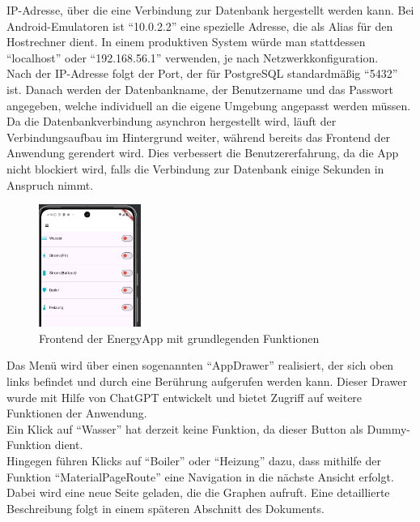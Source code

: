 \documentclass[11pt]{scrartcl}
\begin{document}
    IP-Adresse, über die eine Verbindung zur Datenbank hergestellt werden kann.
    Bei Android-Emulatoren ist \enquote{10.0.2.2} eine spezielle Adresse, die als Alias für den Hostrechner dient.
    In einem produktiven System würde man stattdessen \enquote{localhost} oder \enquote{192.168.56.1} verwenden,
    je nach Netzwerkkonfiguration. \\
    Nach der IP-Adresse folgt der Port, der für PostgreSQL standardmäßig \enquote{5432} ist.
    Danach werden der Datenbankname, der Benutzername und das Passwort angegeben, welche individuell an die eigene
    Umgebung angepasst werden müssen. \\
    Da die Datenbankverbindung asynchron hergestellt wird, läuft der Verbindungsaufbau im Hintergrund weiter, während
    bereits das Frontend der Anwendung gerendert wird.
    Dies verbessert die Benutzererfahrung, da die App nicht blockiert wird, falls die Verbindung zur Datenbank einige
    Sekunden in Anspruch nimmt.
    \begin{figure}
        \centering
        \includegraphics[height=4cm]{images/FrontEndScreenshot}
        \caption{Frontend der EnergyApp mit grundlegenden Funktionen}
    \end{figure}
    Das Menü wird über einen sogenannten \enquote{AppDrawer} realisiert, der sich oben links befindet und
    durch eine Berührung aufgerufen werden kann.
    Dieser Drawer wurde mit Hilfe von ChatGPT entwickelt und bietet Zugriff auf weitere Funktionen der Anwendung. \\
    Ein Klick auf \enquote{Wasser} hat derzeit keine Funktion, da dieser Button als Dummy-Funktion dient. \\
    Hingegen führen Klicks auf \enquote{Boiler} oder \enquote{Heizung} dazu, dass mithilfe der Funktion
    \enquote{MaterialPageRoute} eine Navigation in die nächste Ansicht erfolgt.
    Dabei wird eine neue Seite geladen, die die Graphen aufruft.
    Eine detaillierte Beschreibung folgt in einem späteren Abschnitt des Dokuments.
\end{document}
